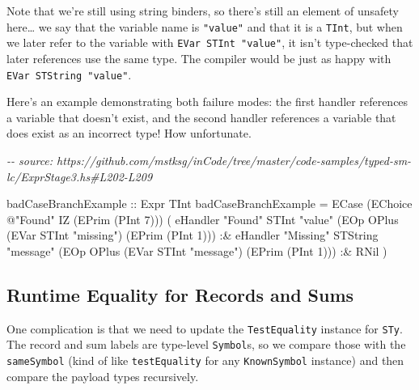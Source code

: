 \documentclass[]{article}
\newenvironment{Shaded}{}{}
\newcommand{\CommentTok}[1]{\textcolor[rgb]{0.38,0.63,0.69}{\textit{#1}}}
\newcommand{\DataTypeTok}[1]{\textcolor[rgb]{0.56,0.13,0.00}{#1}}
\newcommand{\DecValTok}[1]{\textcolor[rgb]{0.25,0.63,0.44}{#1}}
\newcommand{\NormalTok}[1]{#1}
\newcommand{\OperatorTok}[1]{\textcolor[rgb]{0.40,0.40,0.40}{#1}}
\newcommand{\OtherTok}[1]{\textcolor[rgb]{0.00,0.44,0.13}{#1}}
\newcommand{\StringTok}[1]{\textcolor[rgb]{0.25,0.44,0.63}{#1}}
\begin{document}
Note that we're still using string binders, so there's still an element of
unsafety here\ldots{} we say that the variable name is \texttt{"value"} and that
it is a \texttt{TInt}, but when we later refer to the variable with
\texttt{EVar\ STInt\ "value"}, it isn't type-checked that later references use
the same type. The compiler would be just as happy with
\texttt{EVar\ STString\ "value"}.

Here's an example demonstrating both failure modes: the first handler references
a variable that doesn't exist, and the second handler references a variable that
does exist as an incorrect type! How unfortunate.

\begin{Shaded}
\begin{Highlighting}[]
\CommentTok{{-}{-} source: https://github.com/mstksg/inCode/tree/master/code{-}samples/typed{-}sm{-}lc/ExprStage3.hs\#L202{-}L209}

\OtherTok{badCaseBranchExample ::} \DataTypeTok{Expr} \DataTypeTok{TInt}
\NormalTok{badCaseBranchExample }\OtherTok{=}
  \DataTypeTok{ECase}
\NormalTok{    (}\DataTypeTok{EChoice} \OperatorTok{@}\StringTok{"Found"} \DataTypeTok{IZ}\NormalTok{ (}\DataTypeTok{EPrim}\NormalTok{ (}\DataTypeTok{PInt} \DecValTok{7}\NormalTok{)))}
\NormalTok{    ( eHandler }\StringTok{"Found"} \DataTypeTok{STInt} \StringTok{"value"}\NormalTok{ (}\DataTypeTok{EOp} \DataTypeTok{OPlus}\NormalTok{ (}\DataTypeTok{EVar} \DataTypeTok{STInt} \StringTok{"missing"}\NormalTok{) (}\DataTypeTok{EPrim}\NormalTok{ (}\DataTypeTok{PInt} \DecValTok{1}\NormalTok{)))}
        \OperatorTok{:\&}\NormalTok{ eHandler }\StringTok{"Missing"} \DataTypeTok{STString} \StringTok{"message"}\NormalTok{ (}\DataTypeTok{EOp} \DataTypeTok{OPlus}\NormalTok{ (}\DataTypeTok{EVar} \DataTypeTok{STInt} \StringTok{"message"}\NormalTok{) (}\DataTypeTok{EPrim}\NormalTok{ (}\DataTypeTok{PInt} \DecValTok{1}\NormalTok{)))}
        \OperatorTok{:\&} \DataTypeTok{RNil}
\NormalTok{    )}
\end{Highlighting}
\end{Shaded}

\subsection{Runtime Equality for Records and
Sums}\label{runtime-equality-for-records-and-sums}

One complication is that we need to update the \texttt{TestEquality} instance
for \texttt{STy}. The record and sum labels are type-level \texttt{Symbol}s, so
we compare those with the \texttt{sameSymbol} (kind of like
\texttt{testEquality} for any \texttt{KnownSymbol} instance) and then compare
the payload types recursively.
\end{document}
